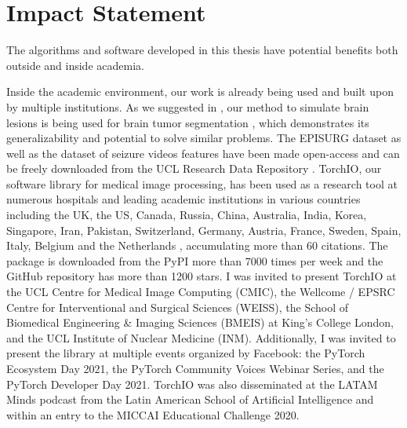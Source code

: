 \chapter{Impact Statement}

The algorithms and software developed in this thesis have potential benefits both outside and inside academia.

Inside the academic environment, our work is already being used and built upon by multiple institutions.
As we suggested in \cite{perez-garcia_self-supervised_2021}, our method to simulate brain lesions is being used for brain tumor segmentation \cite{zhang_self-supervised_2021}, which demonstrates its generalizability and potential to solve similar problems.
The EPISURG dataset as well as the dataset of seizure videos features have been made open-access and can be freely downloaded from the UCL Research Data Repository \cite{perez-garcia_episurg_2020,perez-garcia_data_2021}.
TorchIO, our software library for medical image processing, has been used as a research tool at numerous hospitals and leading academic institutions in various countries including the UK, the US, Canada, Russia, China, Australia, India, Korea, Singapore, Iran, Pakistan, Switzerland, Germany, Austria, France, Sweden, Spain, Italy, Belgium and the Netherlands%
, accumulating more than 60 citations.
The package is downloaded from the \ac{PyPI} more than 7000 times per week and the GitHub repository has more than 1200 stars.
I was invited to present TorchIO at the UCL Centre for Medical Image Computing (CMIC), the Wellcome / EPSRC Centre for Interventional and Surgical Sciences (WEISS), the School of Biomedical Engineering \& Imaging Sciences (BMEIS) at King's College London, and the UCL Institute of Nuclear Medicine (INM).
Additionally, I was invited to present the library at multiple events organized by Facebook: the PyTorch Ecosystem Day 2021, the PyTorch Community Voices Webinar Series, and the PyTorch Developer Day 2021.
TorchIO was also disseminated at the LATAM Minds podcast from the Latin American School of Artificial Intelligence and within an entry to the MICCAI Educational Challenge 2020.

